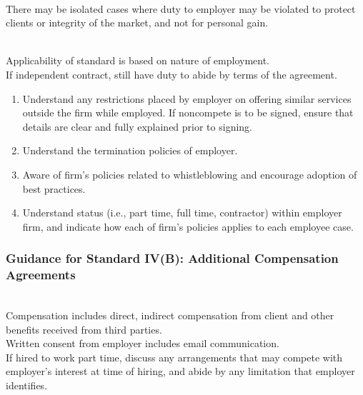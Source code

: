 \begin{remark} \\
There may be isolated cases where duty to employer may be violated to protect clients or integrity of the market, and not for personal gain.
\end{remark}

\begin{remark} \\
Applicability of standard is based on nature of employment.\\
If independent contract, still have duty to abide by terms of the agreement.
\end{remark}

\begin{remark} 
\begin{enumerate}[label=\roman*.]
\setlength{\itemsep}{0pt}
\item Understand any restrictions placed by employer on offering similar services outside the firm while employed. If noncompete is to be signed, ensure that details are clear and fully explained prior to signing.
\item Understand the termination policies of employer.
\item Aware of firm's policies related to whistleblowing and encourage adoption of best practices.
\item Understand status (i.e., part time, full time, contractor) within employer firm, and indicate how each of firm's policies applies to each employee case.
\end{enumerate}
\end{remark}

\subsubsection{Guidance for Standard IV(B): Additional Compensation Agreements}

\begin{remark} \\
Compensation includes direct, indirect compensation from client and other benefits received from third parties.\\
Written consent from employer includes email communication.\\
If hired to work part time, discuss any arrangements that may compete with employer's interest at time of hiring, and abide by any limitation that employer identifies.
\end{remark}

